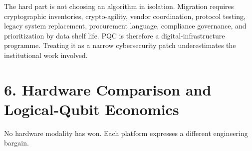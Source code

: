 \documentclass[
  11pt,
  letterpaper,
]{article}
\begin{document}
The hard part is not choosing an algorithm in isolation. Migration
requires cryptographic inventories, crypto-agility, vendor coordination,
protocol testing, legacy system replacement, procurement language,
compliance governance, and prioritization by data shelf life. PQC is
therefore a digital-infrastructure programme. Treating it as a narrow
cybersecurity patch underestimates the institutional work involved.

\section{6. Hardware Comparison and Logical-Qubit
Economics}\label{hardware-comparison-and-logical-qubit-economics}

No hardware modality has won. Each platform expresses a different
engineering bargain.
\end{document}
